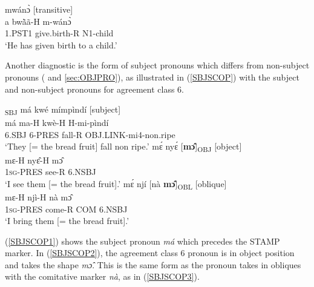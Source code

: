 \begin{exe} 
\ex\label{SBJ2a}
  \glll  [à bwã̀ã́] mwánɔ̀ \hfill [transitive] \\
           a bwã̀ã-H m-wánɔ̀ \\
             1.PST1 give.birth-R N1-child \\
    \trans `He has given birth to a child.'
\end{exe}



Another diagnostic is the form of subject pronouns which differs from non-subject pronouns ( and \ref{sec:OBJPRO}), as illustrated in (\ref{SBJSCOP}) with the subject and non-subject pronouns for agreement class 6.


\begin{exe} 
\ex\label{SBJSCOP}
\begin{xlist}
\ex\label{SBJSCOP1}
  \glll  [{\bfseries má}]\textsubscript{SBJ} má kwé mímpìndí \hfill [subject] \\
         má  ma-H kwè-H H-mi-pìndí \\
         6.SBJ 6-PRES fall-R OBJ.LINK-mi4-non.ripe \\
    \trans `They [= the bread fruit] fall non ripe.'
\ex\label{SBJSCOP2}
  \glll  mɛ́ nyɛ́ [{\bfseries mɔ̂}]\textsubscript{OBJ} \hfill [object] \\
           mɛ-H nyɛ̂-H mɔ̂ \\
             1\textsc{sg}-PRES see-R 6.NSBJ \\
    \trans `I see them [= the bread fruit].'
\ex\label{SBJSCOP3}
  \glll  mɛ́ njí [nà {\bfseries mɔ̂}]\textsubscript{OBL} \hfill [oblique] \\
           mɛ-H njì-H nà mɔ̂ \\
             1\textsc{sg}-PRES come-R COM 6.NSBJ \\
    \trans `I bring them [= the bread fruit].'
\end{xlist}
\end{exe}

\noindent (\ref{SBJSCOP1}) shows the subject pronoun {\itshape má}  which precedes the STAMP marker. In (\ref{SBJSCOP2}), the agreement class 6 pronoun is in object position and takes the shape {\itshape mɔ̂}. This is the same form as the pronoun takes in obliques with the comitative marker {\itshape nà}, as in (\ref{SBJSCOP3}).










